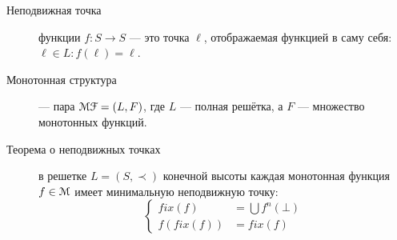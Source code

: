 \begin{center}
\begin{description}

	\item[Неподвижная точка] функции $f: S \rightarrow S$ --- это точка
	  $\ell$, отображаемая функцией в саму себя: $\ell \in L: f(\ell) =
	  \ell$.

	\item[Монотонная структура] --- пара $\EuScript{MF} = (L,F)$,
	  где $L$ --- полная решётка, а $F$ --- множество
	  монотонных функций.

	\item[Теорема о неподвижных точках] в решетке $L = \left( S, \prec
	  \right)$ конечной высоты каждая монотонная функция $f \in
	  \EuScript{M}$ имеет минимальную неподвижную точку:
	  \[
	  \begin{cases}
	    fix(f) &= \bigcup f^{n}(\bot)\\
	    f(fix(f)) &= fix(f)
	  \end{cases}
	  \]
      \end{description}
\end{center}

